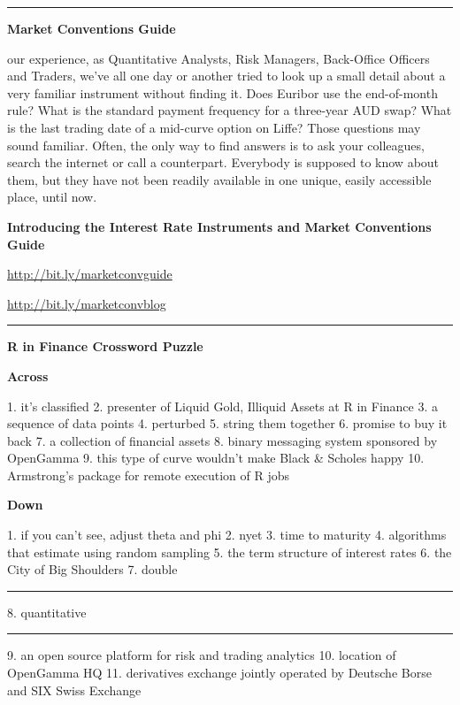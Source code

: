 \documentclass[custom, plainsections]{sciposter}
\begin{document}
\begin{multicols*}{3}
\vspace{0.3cm}
\hrule
\vspace{0.3cm}

\textbf{Market Conventions Guide}

 our experience, as Quantitative Analysts, Risk Managers, Back-Office Officers and Traders, we've all one day or another tried to look up a small detail about a very familiar instrument without finding it. Does Euribor use the end-of-month rule? What is the standard payment frequency for a three-year AUD swap? What is the last trading date of a mid-curve option on Liffe? Those questions may sound familiar. Often, the only way to find answers is to ask your colleagues, search the internet or call a counterpart. Everybody is supposed to know about them, but they have not been readily available in one unique, easily accessible place, until now.

\textbf{Introducing the Interest Rate Instruments and Market Conventions Guide}

\url{http://bit.ly/marketconvguide}

\url{http://bit.ly/marketconvblog}

\vspace{0.3cm}
\hrule
\vspace{0.3cm}

\textbf{R in Finance Crossword Puzzle}

\vspace{0.3cm}

\textbf{Across}

1. it's classified
2. presenter of Liquid Gold, Illiquid Assets at R in Finance
3. a sequence of data points
4. perturbed
5. string them together
6. promise to buy it back
7. a collection of financial assets
8. binary messaging system sponsored by OpenGamma
9. this type of curve wouldn't make Black & Scholes happy
10. Armstrong's package for remote execution of R jobs

\textbf{Down}

1. if you can't see, adjust theta and phi
2. nyet
3. time to maturity
4. algorithms that estimate using random sampling
5. the term structure of interest rates
6. the City of Big Shoulders
7. double \rule{3mm}{.1pt}
8. quantitative \rule{3mm}{.1pt}
9. an open source platform for risk and trading analytics
10. location of OpenGamma HQ
11. derivatives exchange jointly operated by Deutsche Borse and SIX Swiss Exchange

\vspace{0.3cm}


\end{multicols*}
\end{document}
